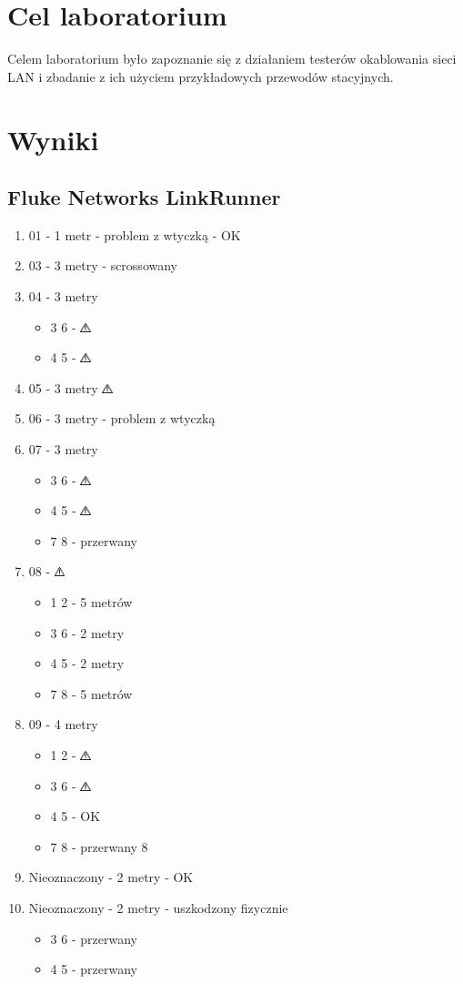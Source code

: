 \documentclass{article}
\newcommand{\warningSymbol}{\includegraphics[height=10px]{graph/warning2.png}}
\begin{document}

\newpage
\section{Cel laboratorium}
Celem laboratorium było zapoznanie się z działaniem testerów okablowania sieci LAN i zbadanie z ich użyciem przykładowych przewodów stacyjnych.
\section{Wyniki}
\subsection{Fluke Networks LinkRunner}
\begin{enumerate}
\item 01 - 1 metr - problem z wtyczką - OK
\item 03 - 3 metry - scrossowany
\item 04 - 3 metry
  \begin{itemize}
  \item 3 6 - \warningSymbol
  \item 4 5 - \warningSymbol
  \end{itemize}
\item 05 - 3 metry \warningSymbol
\item 06 - 3 metry - problem z wtyczką
\item 07 - 3 metry
  \begin{itemize}
  \item 3 6 - \warningSymbol
  \item 4 5 - \warningSymbol
  \item 7 8 - przerwany
  \end{itemize}
\item 08 - \warningSymbol
  \begin{itemize}
  \item 1 2 - 5 metrów
  \item 3 6 - 2 metry
  \item 4 5 - 2 metry
  \item 7 8 - 5 metrów
  \end{itemize}
\item 09 - 4 metry
  \begin{itemize}
  \item 1 2 - \warningSymbol
  \item 3 6 - \warningSymbol
  \item 4 5 - OK
  \item 7 8 - przerwany 8
  \end{itemize}

\item Nieoznaczony - 2 metry - OK
\item Nieoznaczony - 2 metry - uszkodzony fizycznie
  \begin{itemize}
  \item 3 6 - przerwany
  \item 4 5 - przerwany
  \end{itemize}
\end{enumerate}
\end{document}
